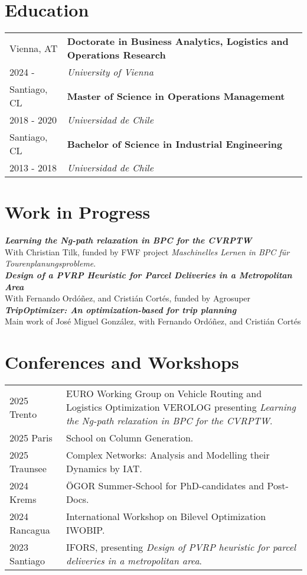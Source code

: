\documentclass[10pt, a4paper]{article}
\begin{document}
\section*{Education}
\noindent
\begin{tabular}{@{} p{} p{} @{}}
    Vienna, AT & \textbf{Doctorate in Business Analytics, Logistics and Operations Research} \\
    2024 -  & \textit{University of Vienna} \\
    Santiago, CL & \textbf{Master of Science in Operations Management} \\
    2018 - 2020 & \textit{Universidad de Chile} \\
    Santiago, CL & \textbf{Bachelor of Science in Industrial Engineering} \\
    2013 - 2018 & \textit{Universidad de Chile} \\
\end{tabular}

\section*{Work in Progress}
\textbf{\textit{Learning the Ng-path relaxation in BPC for the CVRPTW}} \\
With Christian Tilk, funded by FWF project \textit{Maschinelles Lernen in BPC für Tourenplanungsprobleme}.\\
\textbf{\textit{Design of a PVRP Heuristic for Parcel Deliveries in a Metropolitan Area}} \\
With Fernando Ordóñez, and Cristián Cortés, funded by Agrosuper \\
\textbf{\textit{TripOptimizer: An optimization-based for trip planning}}\\
Main work of José Miguel González, with Fernando Ordóñez, and Cristián Cortés \\

\section*{Conferences and Workshops}
\begin{tabular}{@{} p{} p{} @{}}
    2025 Trento & EURO Working Group on Vehicle Routing and Logistics Optimization VEROLOG presenting \textit{Learning the Ng-path relaxation in BPC for the CVRPTW}.\\
    2025 Paris & School on Column Generation.\\
    2025 Traunsee & Complex Networks: Analysis and Modelling their Dynamics by IAT.\\
    2024 Krems & ÖGOR Summer-School for PhD-candidates and Post-Docs.\\
    2024 Rancagua & International Workshop on Bilevel Optimization IWOBIP.\\
    2023 Santiago & IFORS, presenting \textit{Design of PVRP heuristic for parcel deliveries in a metropolitan area}. \\
\end{tabular}
\end{document}
